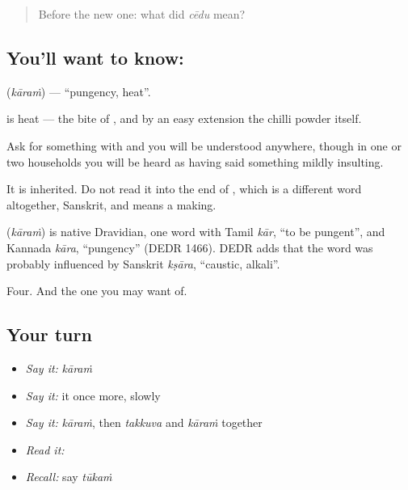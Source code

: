 \label{lesson:TE-C73-pungent}



\begin{quote}
Before the new one: what did \emph{cēdu} mean?
\end{quote}

\subsection*{You'll want to know: }
\textbf{} (\emph{kāraṁ}) — \textquotedblleft{}pungency, heat\textquotedblright{}.

 is heat — the bite of , and by an easy extension the chilli powder itself.

Ask for something with   and you will be understood anywhere, though in one or two households you will be heard as having said something mildly insulting.

It is inherited. Do not read it into the end of , which is a different word altogether, Sanskrit, and means a making.

\begin{cousinweb}
\textbf{} (\emph{kāraṁ}) is native Dravidian, one word with Tamil \emph{kār}, \textquotedblleft{}to be pungent\textquotedblright{}, and Kannada \emph{kāra}, \textquotedblleft{}pungency\textquotedblright{} (DEDR 1466). DEDR adds that the word was probably influenced by Sanskrit \emph{kṣāra}, \textquotedblleft{}caustic, alkali\textquotedblright{}.
\end{cousinweb}

\begin{grammarlens}[title={What you've built}]
Four. And the one you may want  of.
\end{grammarlens}

\subsection*{Your turn}
\begin{itemize}
\raggedright
  \item \emph{Say it:} \emph{kāraṁ}
  \item \emph{Say it:} it once more, slowly
  \item \emph{Say it:} \emph{kāraṁ}, then \emph{takkuva} and \emph{kāraṁ} together
  \item \emph{Read it:} \textbf{}
  \item \emph{Recall:} say \emph{tūkaṁ}
\end{itemize}

